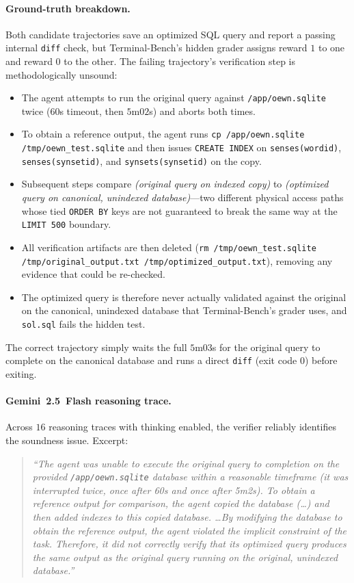 \paragraph{Ground-truth breakdown.} Both candidate trajectories save an optimized SQL query and report a passing internal \texttt{diff} check, but Terminal-Bench's hidden grader assigns reward $1$ to one and reward $0$ to the other. The failing trajectory's verification step is methodologically unsound:
\begin{itemize}
    \item The agent attempts to run the original query against \texttt{/app/oewn.sqlite} twice ($60$s timeout, then $5$m$02$s) and aborts both times.
    \item To obtain a reference output, the agent runs \texttt{cp /app/oewn.sqlite /tmp/oewn\_test.sqlite} and then issues \texttt{CREATE INDEX} on \texttt{senses(wordid)}, \texttt{senses(synsetid)}, and \texttt{synsets(synsetid)} on the copy.
    \item Subsequent steps compare \emph{(original query on indexed copy)} to \emph{(optimized query on canonical, unindexed database)}---two different physical access paths whose tied \texttt{ORDER BY} keys are not guaranteed to break the same way at the \texttt{LIMIT 500} boundary.
    \item All verification artifacts are then deleted (\texttt{rm /tmp/oewn\_test.sqlite /tmp/original\_output.txt /tmp/optimized\_output.txt}), removing any evidence that could be re-checked.
    \item The optimized query is therefore never actually validated against the original on the canonical, unindexed database that Terminal-Bench's grader uses, and \texttt{sol.sql} fails the hidden test.
\end{itemize}
The correct trajectory simply waits the full $5$m$03$s for the original query to complete on the canonical database and runs a direct \texttt{diff} (exit code $0$) before exiting.

\paragraph{Gemini~2.5~Flash reasoning trace.} Across $16$ reasoning traces with thinking enabled, the verifier reliably identifies the soundness issue. Excerpt:
\begin{quote}\small\itshape
``The agent was unable to execute the original query to completion on the provided \texttt{/app/oewn.sqlite} database within a reasonable timeframe (it was interrupted twice, once after 60s and once after 5m2s). To obtain a reference output for comparison, the agent \emph{copied the database} (\ldots) and then \emph{added indexes} to this copied database. \ldots By modifying the database to obtain the reference output, the agent violated the implicit constraint of the task. Therefore, it did not correctly verify that its optimized query produces the same output as the original query running on the original, unindexed database.''
\end{quote}

